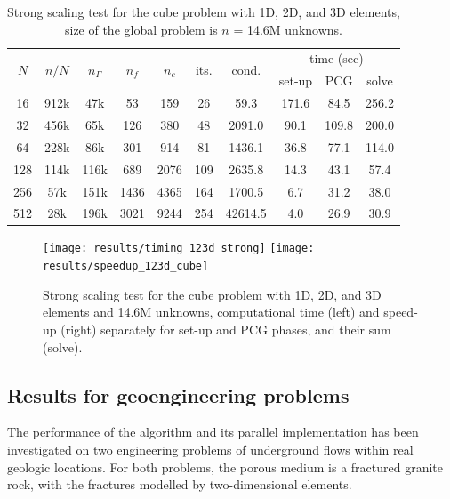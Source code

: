 \begin{table}[ptbh]
\begin{center}
\begin{tabular}
[c]{|cc|ccc|cc|ccc|}\hline
\multirow{2}{*}{$N$} & \multirow{2}{*}{$n/N$} &
\multirow{2}{*}{$n_{\Gamma}$} & \multirow{2}{*}{$n_f$} &
\multirow{2}{*}{$n_c$} & \multirow{2}{*}{its.} & \multirow{2}{*}{cond.} &
\multicolumn{3}{c|}{time (sec)}\\
&  &  &  &  &  &  & set-up & PCG & solve\\\hline
16 & 912k & 47k & 53 & 159 & 26 & 59.3 & 171.6 & 84.5 & 256.2\\
32 & 456k & 65k & 126 & 380 & 48 & 2091.0 & 90.1 & 109.8 & 200.0\\
64 & 228k & 86k & 301 & 914 & 81 & 1436.1 & 36.8 & 77.1 & 114.0\\
128 & 114k & 116k & 689 & 2076 & 109 & 2635.8 & 14.3 & 43.1 & 57.4\\
256 & 57k & 151k & 1436 & 4365 & 164 & 1700.5 & 6.7 & 31.2 & 38.0\\
512 & 28k & 196k & 3021 & 9244 & 254 & 42614.5 & 4.0 & 26.9 & 30.9\\\hline
\end{tabular}
\end{center}
\caption{\label{tab:123d_cube_strong_scaling}
Strong scaling test for the cube problem with 1D, 2D, and 3D
elements, size of the global problem is $n$ = 14.6M unknowns.}
\end{table}

\begin{figure}[ptbh]
\begin{center}
\texttt{[image: results/timing\_123d\_strong]} 
\texttt{[image: results/speedup\_123d\_cube]}
\end{center}
\caption{\label{fig:timing_strong_123d}
Strong scaling test for the cube problem with 1D, 2D, and 3D elements
and 14.6M unknowns, computational time (left) and speed-up (right) separately
for set-up and PCG phases, and their sum (solve).}
\end{figure}

\subsection{Results for geoengineering problems}

\label{sec:results_engineering}

The performance of the algorithm and its parallel implementation has been
investigated on two engineering problems of underground flows within real
geologic locations. For both problems, the porous medium is a fractured
granite rock, with the fractures modelled by two-dimensional elements.

